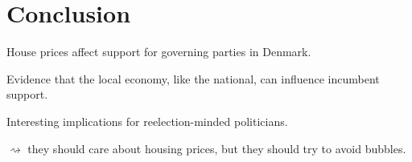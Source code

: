 \documentclass[aspectratio=169]{beamer}
\begin{document}
\section{Conclusion}

	\begin{frame}
	House prices affect support for governing parties in Denmark.
		
	\vspace{0.3in} \pause
	Evidence that the local economy, like the national, can influence incumbent support.
	
	
		\vspace{0.3in} \pause
	Interesting implications for reelection-minded politicians.
	
	
	$\rightsquigarrow$ they should care about housing prices, but they should try to avoid bubbles.

\end{frame}
	
\begin{frame}
	
		
\end{frame}
\end{document}
